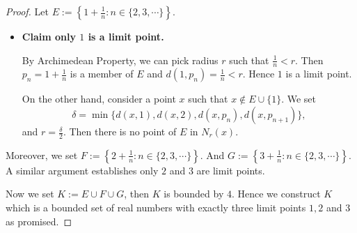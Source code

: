 \begin{Exercise}
	\begin{proof}
		Let $E := \left\{ 1+\frac{1}{n} : n\in \{2,3,\cdots\} \right\}$.
		\begin{itemize}
			\item \textbf{Claim only $1$ is a limit point.}
			
			By Archimedean Property, we can pick radius $r$ such that $\frac{1}{n} < r$. 
			Then $p_n = 1+\frac{1}{n}$ is a member of $E$ and $d(1, p_n) = \frac{1}{n} < r$. 
			Hence $1$ is a limit point.
			
			On the other hand, consider a point $x$ such that $x\notin E\cup \{1\}$. 
			We set 
			$$
			\delta = \min\{d(x,1), d(x,2), d(x, p_n), d(x, p_{n+1})\},
			$$
			and $r = \frac{\delta}{2}$. 
			Then there is no point of $E$ in $N_r(x)$.
		\end{itemize}
		
		Moreover, we set $F := \left\{ 2+\frac{1}{n} : n\in \{2,3,\cdots\} \right\}$. 
		And $G := \left\{ 3+\frac{1}{n} : n\in \{2,3,\cdots\} \right\}$. 
		A similar argument establishes only $2$ and $3$ are limit points.
		
		Now we set $K := E\cup F\cup G$, then $K$ is bounded by $4$.
		Hence we construct $K$ which is a bounded set of real numbers with exactly three limit points $1,2$ and $3$ as promised.
	\end{proof}
\end{Exercise}